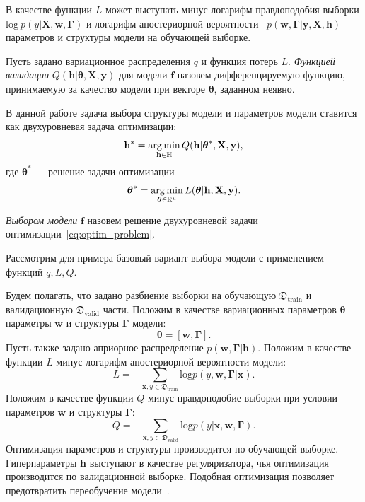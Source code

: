 В качестве функции $L$ может выступать минус логарифм правдоподобия выборки $\text{log}~p(y|\mathbf{X}, \mathbf{w}, \boldsymbol{\Gamma})$  и логарифм апостериорной вероятности ~$p(\mathbf{w}, \boldsymbol{\Gamma}|\mathbf{y}, \mathbf{X}, \mathbf{h}) $ параметров и структуры модели на обучающей выборке.

\begin{defin}
\label{def:q}
Пусть задано вариационное распределения $q$ и функция потерь $L$. 
\textit{Функцией валидации} $Q(\mathbf{h}| \boldsymbol{\theta}, \mathbf{X}, \mathbf{y} )$ для модели $\mathbf{f}$ назовем дифференцируемую функцию, принимаемую за качество модели при векторе $\boldsymbol{\theta}$, заданном неявно.
\end{defin}

 

В данной работе задача выбора структуры модели и параметров модели ставится как двухуровневая задача оптимизации:
\begin{equation}
\label{eq:optim_problem}
	\mathbf{h}^{*} = \operatorname*{arg\,min}_{\mathbf{h} \in \mathbb{H}} Q(\mathbf{h}|  \boldsymbol{\theta}^{*}, \mathbf{X}, \mathbf{y} ),
\end{equation}
где $\boldsymbol{\theta}^{*}$ --- решение задачи оптимизации
\begin{equation}
\label{eq:optim_problem_in}
   \boldsymbol{\theta}^{*} = \operatorname*{arg\,min}_{\boldsymbol{\theta} \in \mathbb{R}^u} L(\boldsymbol{\theta}|  \mathbf{h},  \mathbf{X}, \mathbf{y}).
\end{equation}

\begin{defin}
\textit{Выбором модели} $\mathbf{f}$ назовем решение двухуровневой задачи оптимизации~\eqref{eq:optim_problem}.
\end{defin}

Рассмотрим для примера базовый вариант выбора модели с применением функций $q, L, Q$.
\begin{example}
Будем полагать, что задано разбиение выборки на обучающую $\mathfrak{D}_\text{train}$ и валидационную $\mathfrak{D}_\text{valid}$ части.
Положим в качестве вариационных параметров $\boldsymbol{\theta}$ параметры $\mathbf{w}$ и структуры $\boldsymbol{\Gamma}$ модели:
\[
    \boldsymbol{\theta} = [\mathbf{w}, \boldsymbol{\Gamma}].
\]
Пусть также задано априорное распределение $p(\mathbf{w}, \boldsymbol{\Gamma}|\mathbf{h})$.
Положим в качестве функции $L$ минус логарифм апостериорной вероятности модели:
\[
    L = -\sum_{\mathbf{x},y \in \mathfrak{D}_\text{train}} \text{log}p(y, \mathbf{w}, \boldsymbol{\Gamma}|\mathbf{x}).
\]
Положим в качестве функции $Q$  минус правдоподобие выборки при условии параметров $\mathbf{w}$ и структуры $\boldsymbol{\Gamma}$:
\[
    Q = -\sum_{\mathbf{x},y \in \mathfrak{D}_\text{valid}} \text{log}p(y|\mathbf{x}, \mathbf{w}, \boldsymbol{\Gamma}).
\]
Оптимизация параметров и структуры производится по обучающей выборке. Гиперпараметры $\mathbf{h}$ выступают в качестве регуляризатора, чья оптимизация производится по валидационной выборке. Подобная оптимизация позволяет предотвратить переобучение модели~\cite{hyper}.
\end{example}

